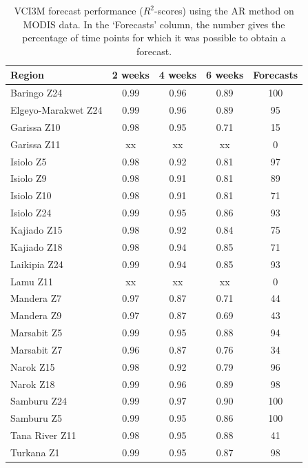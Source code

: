 \documentclass[review]{elsarticle}
\begin{document}
\begin{table}
	\footnotesize
	\caption{VCI3M forecast performance ($R^2$-scores) using the AR method on MODIS data. In the `Forecasts' column, the number gives the percentage of time points for which it was possible to obtain a forecast.  } \label{tab:VCI3m_MODIS}
	\centering
	\begin{tabular}{l|ccc|c} 
		\toprule
		\textbf{Region}  &  \textbf{2 weeks} &  \textbf{4 weeks}  & \textbf{6 weeks} & \textbf{Forecasts} \\
		\midrule
		Baringo Z24 &  	0.99 	& 	 	0.96 	&  	0.89 & 100\\
		Elgeyo-Marakwet Z24 &  	0.99 	& 	 	0.96 	&  	0.89 & 95 	\\
		Garissa Z10 &   	0.98 	& 	 	0.95 	&  	0.71 & 15	\\
		Garissa Z11 &  xx &  xx & xx & 0 \\
		Isiolo Z5 &  	0.98 	& 	 	0.92 	&  	0.81 & 97	 \\
		Isiolo Z9 &   	0.98 	& 	 	0.91 	&  	0.81 & 89	\\
		Isiolo Z10 &  	0.98 	& 	 	0.91 	&  	0.81 & 71\\
		Isiolo Z24 & 	0.99 	& 	 	0.95 	&  	0.86 & 93	\\
		Kajiado Z15 &  	0.98 	& 	 	0.92 	&  	0.84 & 75\\
		Kajiado Z18&  	0.98 	& 	 	0.94 	&  	0.85 & 71\\
		Laikipia Z24 & 	0.99 	& 	 	0.94 	&  	0.85 & 93	\\
		Lamu Z11 &  xx & xx & xx & 0\\
		Mandera Z7 & 	0.97 	& 		0.87 	& 		0.71 & 44	\\
		Mandera Z9 &  	0.97 	& 	 	0.87 	&  	0.69 & 43	\\
		Marsabit Z5 & 	0.99 	& 	 	0.95 	&  	0.88 & 94\\
		Marsabit Z7 &  	0.96 	& 	 	0.87 	&  	0.76	& 34		\\
		Narok Z15 &  	0.98 	& 	 	0.92 	&  	0.79 & 96\\
		Narok Z18& 	0.99 	& 	 	0.96 	&  	0.89 & 98\\
		Samburu Z24 & 	0.99 	& 	 	0.97 	&  	0.90 & 100		\\
		Samburu Z5 & 	0.99 	& 	 	0.95 	&  	0.86 & 100	\\
		Tana River Z11&  	0.98 	& 	 	0.95 	&  	0.88 & 41	\\
		Turkana Z1 & 	0.99 	& 	 	0.95 	&  	0.87 & 98 		\\

\end{tabular}
\end{table}
\end{document}

